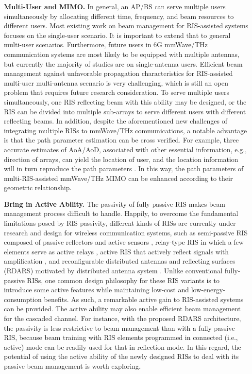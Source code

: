 \documentclass[journal,comsoc]{IEEEtran}
\begin{document}
{\bf{Multi-User and MIMO.}} In general, an AP/BS can serve multiple users simultaneously by allocating different time, frequency, and beam resources to different users. Most existing work on beam management for RIS-assisted systems focuses on the single-user scenario. It is important to extend that to general multi-user scenarios. Furthermore, future users in 6G mmWave/THz communication systems are most likely to be equipped with multiple antennas, but currently the majority of studies are on single-antenna users. Efficient beam management against unfavorable propagation characteristics for RIS-assisted multi-user multi-antenna scenario is very challenging, which is still an open problem that requires future research consideration. To serve multiple users simultaneously, one RIS reflecting beam with this ability may be designed, or the RIS can be divided into multiple sub-arrays to serve different users with different reflecting beams. In addition, despite the aforementioned new challenges of integrating multiple RISs to mmWave/THz communications, a notable advantage is that the path parameter estimation can be cross verified. For example, three accurate estimates of AoA/AoD, associated with other essential information, e.g., direction of arrays, can yield the location of user, and the location information will in turn reproduce the path parameters \cite{Joint-Beam-Training-Positioning-RIS-2021}. In this way, the path parameters of multi-RIS-assisted mmWave/THz MIMO can be enhanced according to their geometric relationship.


{\bf{Bring in Active Ability.}} The passivity of fully-passive RIS makes beam management process difficult to handle. Happily, to overcome the fundamental limitations posed by RIS passivity, different kinds of RISs are currently under research and design for wireless communication systems, such as semi-passive RIS composed of passive reflectors and active sensors \cite{Enabling-Large-RIS-DL-2021,Sensing-Aided-RIS-3GPP-5G,Tensor-Algebraic-Channel-Estimation}, relay-type RIS in which a few elements serve as active relays \cite{Hybrid-Relay-Reflecting-2022}, active RIS that actively reflect signals with amplification \cite{Active-RIS-vs-Passive-2023}, and reconfigurable distributed antennas and reflecting surfaces (RDARS) motivated by distributed antenna system \cite{RDARS-2023}. Unlike conventional fully-passive RISs, one common design philosophy for these RIS variants is to introduce some active features while maintaining low-cost and low-energy-consumption benefits. As such, a remarkable active gain to RIS-assisted systems can be provided. The active ability may also enable efficient beam management for the cascaded channel. For instance, with the proposed RDARS architecture, the passivity is less restrictive to beam management than with a fully-passive RIS, because beam training with RIS elements programmed in connected (i.e., active) mode can be readily used for that in reflection mode. In this regard, the potential of using the active ability of the newly designed RISs to deal with its passive beam management is worth exploring.
\end{document}
